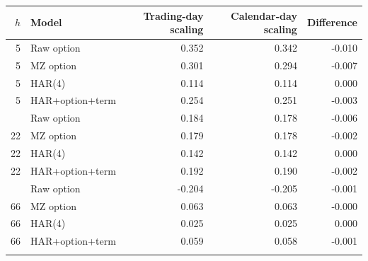 \begin{tabular}{rlrrr}
\toprule
$h$ & Model & Trading-day scaling & Calendar-day scaling & Difference \\
\midrule
5 & Raw option & 0.352 & 0.342 & -0.010 \\
5 & MZ option & 0.301 & 0.294 & -0.007 \\
5 & HAR(4) & 0.114 & 0.114 & 0.000 \\
5 & HAR+option+term & 0.254 & 0.251 & -0.003 \\
\addlinespace
22 & Raw option & 0.184 & 0.178 & -0.006 \\
22 & MZ option & 0.179 & 0.178 & -0.002 \\
22 & HAR(4) & 0.142 & 0.142 & 0.000 \\
22 & HAR+option+term & 0.192 & 0.190 & -0.002 \\
\addlinespace
66 & Raw option & -0.204 & -0.205 & -0.001 \\
66 & MZ option & 0.063 & 0.063 & -0.000 \\
66 & HAR(4) & 0.025 & 0.025 & 0.000 \\
66 & HAR+option+term & 0.059 & 0.058 & -0.001 \\
\addlinespace
\bottomrule
\end{tabular}

